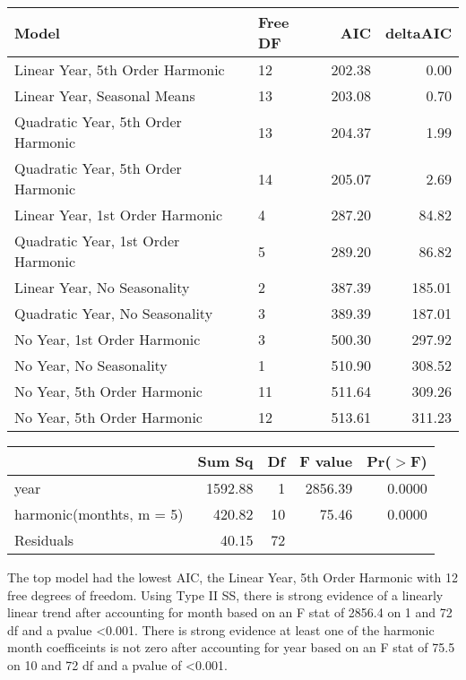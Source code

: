 \documentclass[11pt]{article}\usepackage[]{graphicx}\usepackage[]{color}
\begin{document}
\begin{enumerate}
  
\begin{table}[H]
\centering
\begin{tabular}{llrr}
  \hline
Model & Free DF & AIC & deltaAIC \\ 
  \hline
Linear Year, 5th Order Harmonic & 12 & 202.38 & 0.00 \\ 
  Linear Year, Seasonal Means & 13 & 203.08 & 0.70 \\ 
  Quadratic Year, 5th Order Harmonic & 13 & 204.37 & 1.99 \\ 
  Quadratic Year, 5th Order Harmonic & 14 & 205.07 & 2.69 \\ 
  Linear Year, 1st Order Harmonic & 4 & 287.20 & 84.82 \\ 
  Quadratic Year, 1st Order Harmonic & 5 & 289.20 & 86.82 \\ 
  Linear Year, No Seasonality & 2 & 387.39 & 185.01 \\ 
  Quadratic Year, No Seasonality & 3 & 389.39 & 187.01 \\ 
  No Year, 1st Order Harmonic & 3 & 500.30 & 297.92 \\ 
  No Year, No Seasonality & 1 & 510.90 & 308.52 \\ 
  No Year, 5th Order Harmonic & 11 & 511.64 & 309.26 \\ 
  No Year, 5th Order Harmonic & 12 & 513.61 & 311.23 \\ 
   \hline
\end{tabular}
\end{table}
\begin{table}[H]
\centering
\begin{tabular}{lrrrr}
  \hline
 & Sum Sq & Df & F value & Pr($>$F) \\ 
  \hline
year & 1592.88 & 1 & 2856.39 & 0.0000 \\ 
  harmonic(monthts, m = 5) & 420.82 & 10 & 75.46 & 0.0000 \\ 
  Residuals & 40.15 & 72 &  &  \\ 
   \hline
\end{tabular}
\end{table}

The top model had the lowest AIC, the Linear Year, 5th Order Harmonic with 12 free degrees of freedom. Using Type II SS, there is strong evidence of a linearly linear trend after accounting for month based on an F stat of 2856.4 on 1 and 72 df and a pvalue <0.001. There is strong evidence at least one of the harmonic month coefficeints is not zero after accounting for year based on an F stat of 75.5 on 10 and 72 df and a pvalue of <0.001.


\end{enumerate}
\end{document}
